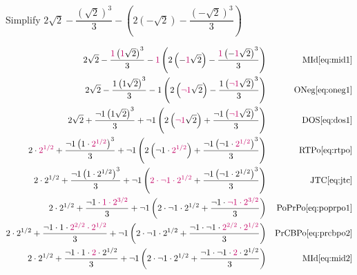 \begin{example}[id:20141108-085327] \label{20141108-085327}  \hfill \\

Simplify $2\sqrt{2}-\dfrac{\left(\sqrt{2}\right)^3}{3}-\left(2\left(-\sqrt{2}\right)-\dfrac{\left(-\sqrt{2}\right)^3}{3} \right)$

\soln

\solnsteps
\begin{align*}
2 \sqrt{2}- \dfrac{\alert{1}\left(\alert{1}\sqrt{2}\right)^{3}}{3}-\alert{1} \left(2 \left(-\alert{1}\sqrt{2} \right) - \dfrac{\alert{1} \left(-\alert{1} \sqrt{2}\right)^{3}}{3} \right) && \text{MId} \eqref{eq:mid1} \\
2 \sqrt{2} - \dfrac{1 \left(1\sqrt{2}\right)^{3}}{3}-1 \left(2 \left(\alert{\neg 1} \sqrt{2} \right) - \dfrac{1 \left(\alert{\neg 1} \sqrt{2}\right)^{3}}{3} \right) && \text{ONeg} \eqref{eq:oneg1} \\
2 \sqrt{2} + \dfrac{\neg 1 \left(1\sqrt{2}\right)^{3}}{3}+ \neg 1 \left(2 \left(\alert{\neg 1} \sqrt{2} \right) + \dfrac{\neg 1 \left(\alert{\neg 1} \sqrt{2}\right)^{3}}{3} \right) && \text{DOS} \eqref{eq:dos1} \\
2 \cdot \alert{2^{1/2}} + \dfrac{\neg 1 \left(1 \cdot \alert{2^{1/2}}\right)^{3}}{3} + \neg 1 \left(2 \left(\neg  1 \cdot \alert{2^{1/2}} \right) + \dfrac{\neg 1 \left(\neg  1  \cdot \alert{2^{1/2}}\right)^{3}}{3} \right) && \text{RTPo} \eqref{eq:rtpo} \\
2 \cdot 2^{1/2} + \dfrac{\neg 1 \left(1 \cdot 2^{1/2}\right)^{3}}{3} + \neg 1 \left(\alert{2 \cdot \neg  1 \cdot 2^{1/2}} + \dfrac{\neg 1 \left(\neg 1  \cdot 2^{1/2}\right)^{3}}{3} \right) && \text{JTC} \eqref{eq:jtc} \\
2 \cdot 2^{1/2} + \dfrac{\neg 1 \cdot \alert{1 \cdot 2^{3/2}}}{3} + \neg 1 \left(2 \cdot \neg  1 \cdot 2^{1/2} + \dfrac{\neg 1 \cdot \alert{\neg 1  \cdot 2^{3/2}}}{3} \right) && \text{PoPrPo} \eqref{eq:poprpo1} \\
2 \cdot 2^{1/2} + \dfrac{\neg 1 \cdot 1 \cdot \alert{2^{2/2} \cdot 2^{1/2}}}{3} + \neg 1 \left(2 \cdot \neg  1 \cdot 2^{1/2} + \dfrac{\neg 1 \cdot \neg 1  \cdot \alert{2^{2/2} \cdot 2^{1/2}}}{3} \right) && \text{PrCBPo} \eqref{eq:prcbpo2} \\
2 \cdot 2^{1/2} + \dfrac{\neg 1 \cdot 1 \cdot \alert{2} \cdot 2^{1/2}}{3} + \neg 1 \left(2 \cdot \neg  1 \cdot 2^{1/2} + \dfrac{\neg 1 \cdot \neg 1  \cdot \alert{2} \cdot 2^{1/2}}{3} \right) && \text{MId} \eqref{eq:mid2} \\

\end{align*}
\end{example}
